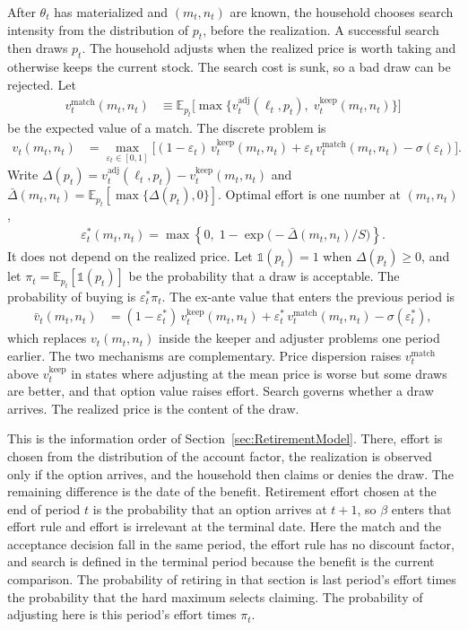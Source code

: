 After $\theta_t$ has materialized and $(m_t,n_t)$ are known, the household chooses search intensity from the distribution of $p_t$, before the realization. A successful search then draws $p_t$. The household adjusts when the realized price is worth taking and otherwise keeps the current stock. The search cost is sunk, so a bad draw can be rejected. Let
\begin{align}
	v_t^{\mathrm{match}}(m_t,n_t)
	&\equiv \mathbb{E}_{p_t}\Big[\max\big\{ v_t^{\text{adj}}(\ell_t,p_t),\; v_t^{\text{keep}}(m_t,n_t)\big\}\Big]
\end{align}
be the expected value of a match. The discrete problem is
\begin{align}
	v_t(m_t,n_t)
	&= \max_{\varepsilon_t\in[0,1]}
	\Big[(1-\varepsilon_t)\, v_t^{\text{keep}}(m_t,n_t)
	+ \varepsilon_t\, v_t^{\mathrm{match}}(m_t,n_t)
	- \sigma(\varepsilon_t)\Big]. \label{eq:full_discrete}
\end{align}
Write $\Delta(p_t) = v_t^{\text{adj}}(\ell_t,p_t) - v_t^{\text{keep}}(m_t,n_t)$ and $\bar\Delta(m_t,n_t) = \mathbb{E}_{p_t}[\max\{\Delta(p_t),0\}]$. Optimal effort is one number at $(m_t,n_t)$,
\begin{align}
	\varepsilon_t^\ast(m_t,n_t)
	= \max\left\{0,\;
	1 - \exp\big(-\bar\Delta(m_t,n_t)/S\big)
	\right\}. \label{eq:full_eps}
\end{align}
It does not depend on the realized price. Let $\mathbb{1}(p_t)=1$ when $\Delta(p_t)\ge 0$, and let $\pi_t=\mathbb{E}_{p_t}[\mathbb{1}(p_t)]$ be the probability that a draw is acceptable. The probability of buying is $\varepsilon_t^\ast\pi_t$. The ex-ante value that enters the previous period is
\begin{align}
	\bar v_t(m_t,n_t)
	&= (1-\varepsilon_t^\ast)\, v_t^{\text{keep}}(m_t,n_t)
	+ \varepsilon_t^\ast\, v_t^{\mathrm{match}}(m_t,n_t)
	- \sigma(\varepsilon_t^\ast), \label{eq:full_barv}
\end{align}
which replaces $v_t(m_t,n_t)$ inside the keeper and adjuster problems one period earlier. The two mechanisms are complementary. Price dispersion raises $v_t^{\mathrm{match}}$ above $v_t^{\text{keep}}$ in states where adjusting at the mean price is worse but some draws are better, and that option value raises effort. Search governs whether a draw arrives. The realized price is the content of the draw.

This is the information order of Section~\ref{sec:RetirementModel}. There, effort is chosen from the distribution of the account factor, the realization is observed only if the option arrives, and the household then claims or denies the draw. The remaining difference is the date of the benefit. Retirement effort chosen at the end of period $t$ is the probability that an option arrives at $t+1$, so $\beta$ enters that effort rule and effort is irrelevant at the terminal date. Here the match and the acceptance decision fall in the same period, the effort rule has no discount factor, and search is defined in the terminal period because the benefit is the current comparison. The probability of retiring in that section is last period's effort times the probability that the hard maximum selects claiming. The probability of adjusting here is this period's effort times $\pi_t$.

